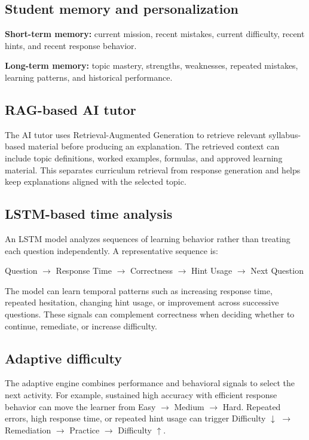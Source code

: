 \documentclass[11pt]{article}
\begin{document}
\subsection{Student memory and personalization}
\textbf{Short-term memory:} current mission, recent mistakes, current difficulty, recent hints, and recent response behavior.

\textbf{Long-term memory:} topic mastery, strengths, weaknesses, repeated mistakes, learning patterns, and historical performance.

\subsection{RAG-based AI tutor}
The AI tutor uses Retrieval-Augmented Generation to retrieve relevant syllabus-based material before producing an explanation. The retrieved context can include topic definitions, worked examples, formulas, and approved learning material. This separates curriculum retrieval from response generation and helps keep explanations aligned with the selected topic.

\subsection{LSTM-based time analysis}
An LSTM model analyzes sequences of learning behavior rather than treating each question independently. A representative sequence is:

\begin{center}
Question $\rightarrow$ Response Time $\rightarrow$ Correctness $\rightarrow$ Hint Usage $\rightarrow$ Next Question
\end{center}

The model can learn temporal patterns such as increasing response time, repeated hesitation, changing hint usage, or improvement across successive questions. These signals can complement correctness when deciding whether to continue, remediate, or increase difficulty.

\subsection{Adaptive difficulty}
The adaptive engine combines performance and behavioral signals to select the next activity. For example, sustained high accuracy with efficient response behavior can move the learner from Easy $\rightarrow$ Medium $\rightarrow$ Hard. Repeated errors, high response time, or repeated hint usage can trigger Difficulty $\downarrow$ $\rightarrow$ Remediation $\rightarrow$ Practice $\rightarrow$ Difficulty $\uparrow$.
\end{document}
